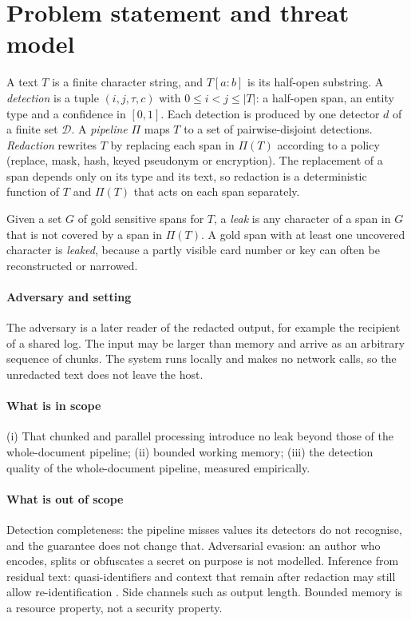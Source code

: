 \section{Problem statement and threat model}\label{sec:problem}

\begin{definition}\label{def:det}
A text $T$ is a finite character string, and $T[a{:}b]$ is its half-open substring. A \emph{detection} is a tuple $(i, j, \tau, c)$ with $0 \le i < j \le |T|$: a half-open span, an entity type and a confidence in $[0,1]$. Each detection is produced by one detector $d$ of a finite set $\mathcal{D}$. A \emph{pipeline} $\Pi$ maps $T$ to a set of pairwise-disjoint detections. \emph{Redaction} rewrites $T$ by replacing each span in $\Pi(T)$ according to a policy (replace, mask, hash, keyed pseudonym or encryption). The replacement of a span depends only on its type and its text, so redaction is a deterministic function of $T$ and $\Pi(T)$ that acts on each span separately.
\end{definition}

\begin{definition}[Leak]
Given a set $G$ of gold sensitive spans for $T$, a \emph{leak} is any character of a span in $G$ that is not covered by a span in $\Pi(T)$. A gold span with at least one uncovered character is \emph{leaked}, because a partly visible card number or key can often be reconstructed or narrowed.
\end{definition}

\paragraph{Adversary and setting}
The adversary is a later reader of the redacted output, for example the recipient of a shared log. The input may be larger than memory and arrive as an arbitrary sequence of chunks. The system runs locally and makes no network calls, so the unredacted text does not leave the host.

\paragraph{What is in scope}
(i) That chunked and parallel processing introduce no leak beyond those of the whole-document pipeline; (ii) bounded working memory; (iii) the detection quality of the whole-document pipeline, measured empirically.

\paragraph{What is out of scope}
Detection completeness: the pipeline misses values its detectors do not recognise, and the guarantee does not change that. Adversarial evasion: an author who encodes, splits or obfuscates a secret on purpose is not modelled. Inference from residual text: quasi-identifiers and context that remain after redaction may still allow re-identification \cite{lison2021anonymisation,sweeney2002kanonymity}. Side channels such as output length. Bounded memory is a resource property, not a security property.
